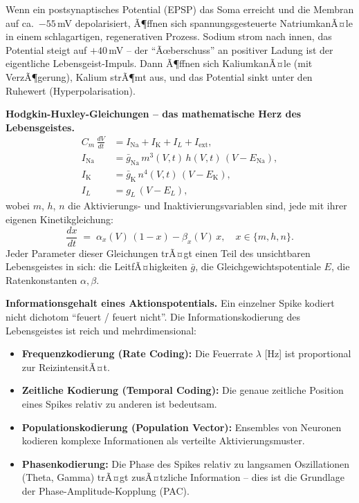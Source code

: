 ﻿\documentclass[12pt,a4paper]{report}
\theoremstyle{plain}
\theoremstyle{definition}
\theoremstyle{remark}
\begin{document}
	Wenn ein postsynaptisches Potential (EPSP) das Soma erreicht und die
	Membran auf ca.\ $-55$\,mV depolarisiert, Ã¶ffnen sich
	spannungsgesteuerte NatriumkanÃ¤le in einem schlagartigen, regenerativen
	Prozess. Sodium strom nach innen, das Potential steigt auf $+40$\,mV --
	der ``Ãœberschuss'' an positiver Ladung ist der eigentliche Lebensgeist-Impuls.
	Dann Ã¶ffnen sich KaliumkanÃ¤le (mit VerzÃ¶gerung), Kalium strÃ¶mt aus,
	und das Potential sinkt unter den Ruhewert (Hyperpolarisation).
	
	\textbf{Hodgkin-Huxley-Gleichungen -- das mathematische Herz des Lebensgeistes.}
	\begin{align}
		C_m\,\frac{dV}{dt} &= I_{\mathrm{Na}} + I_{\mathrm{K}} + I_L + I_{\mathrm{ext}},\\[6pt]
		I_{\mathrm{Na}} &= \bar{g}_{\mathrm{Na}}\,m^3(V,t)\,h(V,t)\,(V - E_{\mathrm{Na}}),\\[4pt]
		I_{\mathrm{K}}  &= \bar{g}_{\mathrm{K}} \,n^4(V,t)\,(V - E_{\mathrm{K}}),\\[4pt]
		I_L             &= g_L\,(V - E_L),
	\end{align}
	wobei $m$, $h$, $n$ die Aktivierungs- und Inaktivierungsvariablen sind,
	jede mit ihrer eigenen Kinetikgleichung:
	\[
	\frac{dx}{dt} \;=\; \alpha_x(V)\,(1-x) - \beta_x(V)\,x,
	\quad x \in \{m, h, n\}.
	\]
	Jeder Parameter dieser Gleichungen trÃ¤gt einen Teil des
	unsichtbaren Lebensgeistes in sich: die LeitfÃ¤higkeiten $\bar{g}$,
	die Gleichgewichtspotentiale $E$, die Ratenkonstanten $\alpha, \beta$.
	
	\textbf{Informationsgehalt eines Aktionspotentials.}
	Ein einzelner Spike kodiert nicht dichotom ``feuert / feuert nicht''.
	Die Informationskodierung des Lebensgeistes ist reich und mehrdimensional:
	\begin{itemize}
		\item \textbf{Frequenzkodierung (Rate Coding):} Die Feuerrate
		$\lambda$ [Hz] ist proportional zur ReizintensitÃ¤t.
		\item \textbf{Zeitliche Kodierung (Temporal Coding):} Die genaue
		zeitliche Position eines Spikes relativ zu anderen ist bedeutsam.
		\item \textbf{Populationskodierung (Population Vector):} Ensembles
		von Neuronen kodieren komplexe Informationen als verteilte
		Aktivierungsmuster.
		\item \textbf{Phasenkodierung:} Die Phase des Spikes relativ zu
		langsamen Oszillationen (Theta, Gamma) trÃ¤gt zusÃ¤tzliche
		Information -- dies ist die Grundlage der
		Phase-Ampli\-tude-Kopplung (PAC).
	\end{itemize}
	
\end{document}
